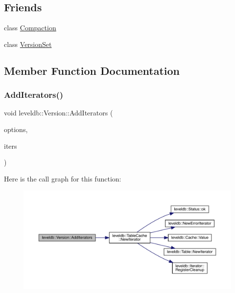 \subsection*{Friends}
\begin{DoxyCompactItemize}
\item 
class \mbox{\hyperlink{classleveldb_1_1_version_a9372e882b35d27c78356228e4b758917}{Compaction}}
\item 
class \mbox{\hyperlink{classleveldb_1_1_version_a1827cd1b4d6e9e3c378ce37ca3cce635}{Version\+Set}}
\end{DoxyCompactItemize}


\subsection{Member Function Documentation}
\mbox{\label{classleveldb_1_1_version_a035a0fa5bfe7ab84a711b1138b0b9a3d}} 
\subsubsection{\texorpdfstring{AddIterators()}{AddIterators()}}
{\footnotesize\ttfamily void leveldb\+::\+Version\+::\+Add\+Iterators (\begin{DoxyParamCaption}\item[{const \mbox{\hyperlink{structleveldb_1_1_read_options}{Read\+Options}} \&}]{options,  }\item[{std\+::vector$<$ \mbox{\hyperlink{classleveldb_1_1_iterator}{Iterator}} $\ast$ $>$ $\ast$}]{iters }\end{DoxyParamCaption})}

Here is the call graph for this function\+:
\nopagebreak
\begin{figure}[H]
\begin{center}
\leavevmode
\includegraphics[width=350pt]{classleveldb_1_1_version_a035a0fa5bfe7ab84a711b1138b0b9a3d_cgraph}
\end{center}
\end{figure}
\mbox{\label{classleveldb_1_1_version_abf1f1702c439aea453b041d5db6b7e63}} 
